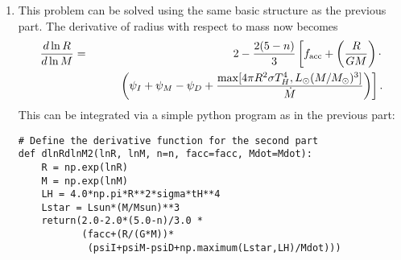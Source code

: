 \begin{enumerate}
\begin{enumerate}
\begin{verbatim}
# Define some constants in cgs
G = 6.67e-8
eV = 1.6e-12
amu = 1.66e-24
sigma = 5.67e-5
Msun = 1.99e33
Rsun = 6.96e10
Lsun = 3.83e33
yr = 365.25*24.*3600.

# Problem parameters
psiI = 13.6*eV/amu
psiM = 2.2*eV/amu
psiD = 100*eV/amu
tH = 3500.0

# Default parameters
n = 1.5
facc = 0.75
Mdot = 1e-5*Msun/yr

# Define the derivative function
def dlnRdlnM(lnR, lnM, n=n, facc=facc, Mdot=Mdot):
    R = np.exp(lnR)
    M = np.exp(lnM)
    return(2.0-2.0*(5.0-n)/3.0 *
           (facc+(R/(G*M))*
            (psiI+psiM-psiD+
             4.0*np.pi*R**2*sigma*tH**4/Mdot)))

# Integrate
lnM = np.log(np.logspace(-2, 0, 500)*Msun)
lnR = odeint(dlnRdlnM, np.log(2.5*Rsun), lnM,
             args=(n, facc, Mdot))
R = np.exp(lnR[:,0])
M = np.exp(lnM)
             
# Get luminosity
L = facc*G*M*Mdot/R + 4.0*np.pi*R**2*sigma*tH**4

# Plot radius
p1,=plt.plot(M/Msun, R/Rsun, 'b', lw=2)
plt.xscale('log')
plt.xlabel(r'$M/M_\odot$')
plt.ylabel(r'$R/R_\odot$')

# Plot luminosity
plt.twinx()
p2,=plt.plot(M/Msun, L/Lsun, 'r', lw=2)
plt.ylabel(r'$L/L_\odot$')
plt.legend([p1,p2], ['Radius', 'Luminosity'],
           loc='lower right')
\end{verbatim}
\begin{marginfigure}
\texttt{[image: hw4sol1]}
\caption[Solution to problem set~\thesolutionset, problem~\theenumi\theenumii]{
\label{fig:hw4sol1}
Radius (blue) and luminosity (red) for the simple protostellar evolution model.
}
\end{marginfigure}
The resulting output is shown as Figure \ref{fig:hw4sol1}. Note that the radius is too large by a factor of $\sim 3$ compared to more sophisticated models, mainly due to the incorrect assumption that all the accreted deuterium burns as quickly as it accretes. In reality the D luminosity should be significantly lower, because D burning lasts longer than accretion.

\item This problem can be solved using the same basic structure as the previous part. The derivative of radius with respect to mass now becomes
\begin{eqnarray*}
\frac{d\ln R}{d\ln M} & = & 2 - \frac{2(5-n)}{3} \left[f_{\rm acc} + \left(\frac{R}{G M}\right) \cdot \right.
\\
& & \qquad \left.\left(\psi_I+\psi_M -\psi_D + \frac{\max[4\pi R^2\sigma T_H^4, L_{\odot} (M/M_{\odot})^3]}{\dot{M}}\right)\right].
\end{eqnarray*}
This can be integrated via a simple python program as in the previous part:
\begin{verbatim}
# Define the derivative function for the second part
def dlnRdlnM2(lnR, lnM, n=n, facc=facc, Mdot=Mdot):
    R = np.exp(lnR)
    M = np.exp(lnM)
    LH = 4.0*np.pi*R**2*sigma*tH**4
    Lstar = Lsun*(M/Msun)**3
    return(2.0-2.0*(5.0-n)/3.0 *
           (facc+(R/(G*M))*
            (psiI+psiM-psiD+np.maximum(Lstar,LH)/Mdot)))


\end{verbatim}
\end{enumerate}
\end{enumerate}
